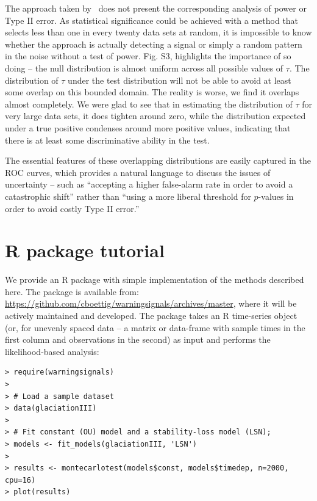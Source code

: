 \documentclass[11pt]{elsarticle}
\begin{document}
The approach taken by~\citet{Dakos2008} does not present the corresponding analysis of power or Type II error.  As statistical significance could be achieved with a method that selects less than one in every twenty data sets at random, it is impossible to know whether the approach is actually detecting a signal or simply a random pattern in the noise without a test of power.  Fig. S3, highlights the importance of so doing -- the null distribution is almost uniform across all possible values of $\tau$.  The distribution of $\tau$ under the test distribution will not be able to avoid at least some overlap on this bounded domain.  The reality is worse, we find it overlaps almost completely.  We were glad to see that in estimating the distribution of $\tau$ for very large data sets, it does tighten around zero, while the distribution expected under a true positive condenses around more positive values, indicating that there is at least some discriminative ability in the test. 

The essential features of these overlapping distributions are easily captured in the ROC curves, which provides a natural language to discuss the issues of uncertainty -- such as ``accepting a higher false-alarm rate in order to avoid a catastrophic shift'' rather than ``using a more liberal threshold for $p$-values in order to avoid costly Type II error.''  



\section{R package tutorial}\label{R}
We provide an R package with simple implementation of the methods described here.  The package is available from: \href{https://github.com/cboettig/warningsignals/archives/master}{https://github.com/cboettig/warningsignals/archives/master}, where it will be actively maintained and developed.  The package takes an R time-series object (or, for unevenly spaced data -- a matrix or data-frame with sample times in the first column and observations in the second) as input and performs the likelihood-based analysis:

\begin{verbatim}
> require(warningsignals)
>
> # Load a sample dataset
> data(glaciationIII)
>
> # Fit constant (OU) model and a stability-loss model (LSN);
> models <- fit_models(glaciationIII, 'LSN')
>
> results <- montecarlotest(models$const, models$timedep, n=2000, cpu=16)
> plot(results)
\end{verbatim}
\end{document}
